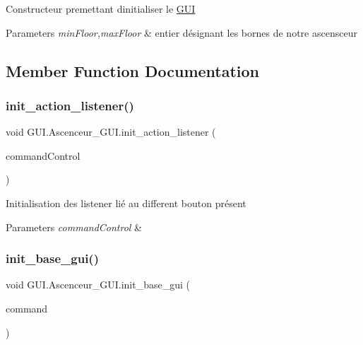 Constructeur premettant d\textquotesingle{}initialiser le \mbox{\hyperlink{namespace_g_u_i}{G\+UI}} 
\begin{DoxyParams}{Parameters}
{\em min\+Floor,max\+Floor} & entier désignant les bornes de notre ascensceur \\
\hline
\end{DoxyParams}


\subsection{Member Function Documentation}
\mbox{\label{class_g_u_i_1_1_ascenceur___g_u_i_ac1628fa2c2af89aba62d72cd3f19c1b3}} 
\subsubsection{\texorpdfstring{init\_action\_listener()}{init\_action\_listener()}}
{\footnotesize\ttfamily void G\+U\+I.\+Ascenceur\+\_\+\+G\+U\+I.\+init\+\_\+action\+\_\+listener (\begin{DoxyParamCaption}\item[{\mbox{\hyperlink{interfacecontrol_1_1_command_control}{Command\+Control}}}]{command\+Control }\end{DoxyParamCaption})\hspace{0.3cm}{\ttfamily [private]}}

Initialisation des listener lié au different bouton présent 
\begin{DoxyParams}{Parameters}
{\em command\+Control} & \\
\hline
\end{DoxyParams}
\mbox{\label{class_g_u_i_1_1_ascenceur___g_u_i_a6b457aeb9c45d8fcb9ccff234375aba2}} 
\subsubsection{\texorpdfstring{init\_base\_gui()}{init\_base\_gui()}}
{\footnotesize\ttfamily void G\+U\+I.\+Ascenceur\+\_\+\+G\+U\+I.\+init\+\_\+base\+\_\+gui (\begin{DoxyParamCaption}\item[{J\+Panel}]{command }\end{DoxyParamCaption})\hspace{0.3cm}{\ttfamily [private]}}

